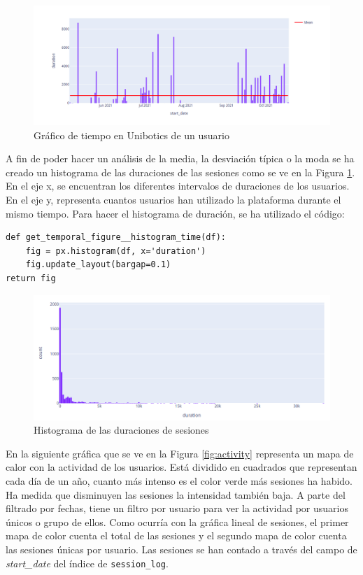 \begin{figure}[H]
    \centering
    \includegraphics[width=14cm, keepaspectratio]{img/time_user.png}
    \caption{Gráfico de tiempo en Unibotics de un usuario}
    \label{fig:time_user}
\end{figure}

A fin de poder hacer un análisis de la media, la desviación típica o la moda se ha creado un histograma de las duraciones de las sesiones como se ve en la Figura \ref{fig:time_user}. En el eje x, se encuentran los diferentes intervalos de duraciones de los usuarios. En el eje y, representa cuantos usuarios han utilizado la plataforma durante el mismo tiempo. Para hacer el histograma de duración, se ha utilizado el código:
\begin{verbatim}
def get_temporal_figure__histogram_time(df):
    fig = px.histogram(df, x='duration')
    fig.update_layout(bargap=0.1)
return fig
\end{verbatim}

\begin{figure}[H]
    \centering
    \includegraphics[width=15cm, keepaspectratio]{img/time_histogram.png}
    \caption{Histograma de las duraciones de sesiones}
    \label{fig:time_histogram}
\end{figure}
\newpage
En la siguiente gráfica que se ve en la Figura \ref{fig:activity} representa un mapa de calor con la actividad de los usuarios. Está dividido en cuadrados que representan cada día de un año, cuanto más intenso es el color verde más sesiones ha habido. Ha medida que disminuyen las sesiones la intensidad también baja. A parte del filtrado por fechas, tiene un filtro por usuario para ver la actividad por usuarios únicos o grupo de ellos. Como ocurría con la gráfica lineal de sesiones, el primer mapa de color cuenta el total de las sesiones y el segundo mapa de color cuenta las sesiones únicas por usuario. Las sesiones se han contado a través del campo de \textit{start\_date} del índice de \texttt{session\_log}.


